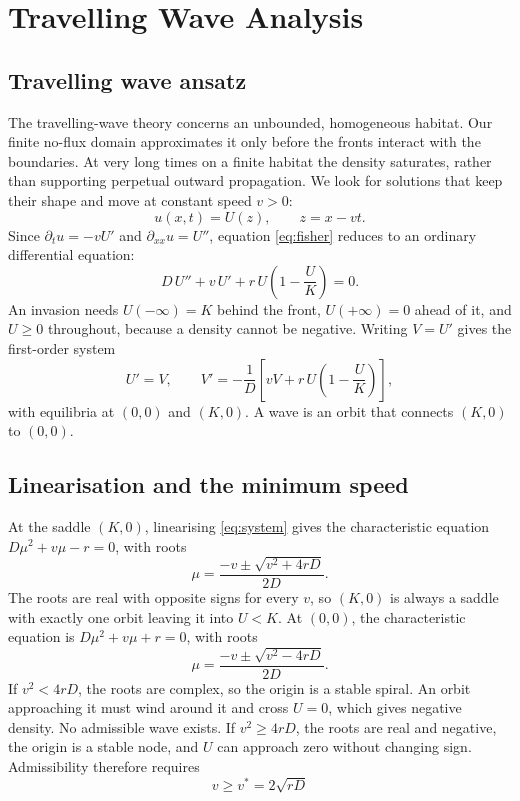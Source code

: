 \documentclass[11pt,a4paper]{article}
\begin{document}
\section{Travelling Wave Analysis}\label{sec:waves}

\subsection{Travelling wave ansatz}
The travelling-wave theory concerns an unbounded, homogeneous habitat. Our finite
no-flux domain approximates it only before the fronts interact with the boundaries.
At very long times on a finite habitat the density saturates, rather than supporting
perpetual outward propagation.
We look for solutions that keep their shape and move at constant speed $v>0$:
\begin{equation}
  u(x,t)=U(z),\qquad z=x-vt .
\end{equation}
Since $\partial_t u=-vU'$ and $\partial_{xx}u=U''$, equation \eqref{eq:fisher} reduces to an ordinary
differential equation:
\begin{equation}
  D\,U''+v\,U'+r\,U\left(1-\frac{U}{K}\right)=0 .
  \label{eq:waveode}
\end{equation}
An invasion needs $U(-\infty)=K$ behind the front, $U(+\infty)=0$ ahead of it, and $U\ge0$ throughout,
because a density cannot be negative. Writing $V=U'$ gives the first-order system
\begin{equation}
  U'=V,\qquad V'=-\frac{1}{D}\left[vV+r\,U\left(1-\frac{U}{K}\right)\right],
  \label{eq:system}
\end{equation}
with equilibria at $(0,0)$ and $(K,0)$. A wave is an orbit that connects $(K,0)$ to $(0,0)$.

\subsection{Linearisation and the minimum speed}
At the saddle $(K,0)$, linearising \eqref{eq:system} gives the characteristic equation
$D\mu^2+v\mu-r=0$, with roots
\begin{equation}
  \mu=\frac{-v\pm\sqrt{v^2+4rD}}{2D}.
\end{equation}
The roots are real with opposite signs for every $v$, so $(K,0)$ is always a saddle with exactly one
orbit leaving it into $U<K$. At $(0,0)$, the characteristic equation is $D\mu^2+v\mu+r=0$, with roots
\begin{equation}
  \mu=\frac{-v\pm\sqrt{v^2-4rD}}{2D}.
  \label{eq:originroots}
\end{equation}
If $v^2<4rD$, the roots are complex, so the origin is a stable spiral. An orbit approaching it must
wind around it and cross $U=0$, which gives negative density. No admissible wave exists. If
$v^2\ge4rD$, the roots are real and negative, the origin is a stable node, and $U$ can approach zero
without changing sign. Admissibility therefore requires
\begin{equation}
  \boxed{\;v\ge v^*=2\sqrt{rD}\;}
  \label{eq:vstar}
\end{equation}
\end{document}

